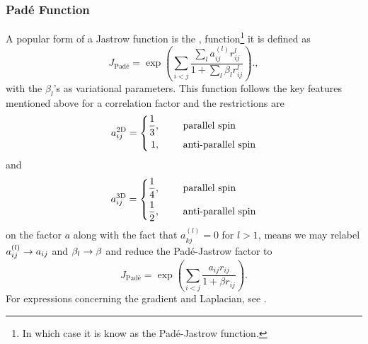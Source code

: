     \subsubsection{Pad\'e Function\label{sususec:TWFPadeJastrow}} 
    A popular form of a Jastrow function is the ,
    function\footnote{In which case it is know as the Pad\'e-Jastrow function.}
    it is defined as \cite{basicMB, MCAbInitoChem}
            \begin{equation}
                J_{\text{Pad\'e}} =
                \exp\left(\sum\limits_{i<j}\frac{\sum\limits_la^{(l)}_{ij}
                r^l_{ij}}{1 + \sum\limits_l \beta_l r^l_{ij}}\right).,
            \end{equation}
    with the $\beta_l$'s as variational parameters. This function follows the
    key features mentioned above for a correlation factor and the restrictions
    are
        \begin{equation}
            a^{\text{2D}}_{ij} = \left\{\begin{aligned}
                    \frac{1}{3},&\indent& &\text{parallel spin} \\
                    1,&\indent& &\text{anti-parallel spin}
                \end{aligned}\right.
        \end{equation}
    and
        \begin{equation}
            a^{\text{3D}}_{ij} = \left\{\begin{aligned}
                    \frac{1}{4},&\indent& &\text{parallel spin} \\
                    \frac{1}{2},&\indent& &\text{anti-parallel spin}
                \end{aligned}\right.
        \end{equation}
    on the factor $a$ along with the fact that $a^{(l)}_{kj}=0$ for $l>1$,
    means we may relabel $a^{(l)}_{ij}\rightarrow a_{ij}$ and $\beta_l\rightarrow \beta$
    and reduce the Pad\'e-Jastrow factor to
        \begin{equation}
            J_{\text{Pad\'e}} = \exp\left(\sum\limits_{i<j}\frac{a_{ij}
            r_{ij}}{1 + \beta r_{ij}}\right).
            \label{eq:padereduceddef}
        \end{equation}
    For expressions concerning the gradient and Laplacian, see
    .

